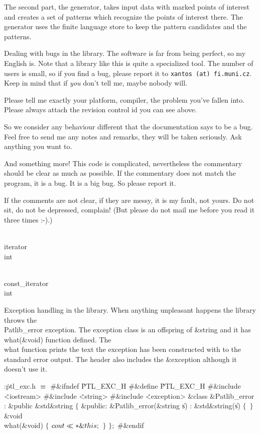 The second part, the generator, takes input data with marked points of
interest and creates a set of patterns which recognize the points of
interest there. The generator uses the finite language store to keep the
pattern candidates and the patterns.

\fi

Dealing with bugs in the library. The software is far from being perfect,
so my English is. Note that a library like this is quite a
specialized tool. The number of users is small, so if you find a bug,
please report it to {\tt xantos (at) fi.muni.cz}. Keep in mind that if
{\it you\/} don't tell me, maybe nobody will.

Please tell me exactly your platform, compiler, the problem you've fallen
into. Please always attach the revision control id you can see above.

So we consider any behaviour different that the documentation says to be a
bug. Feel free to send me any notes and remarks, they will be taken
seriously. Ask anything you want to.

And something more! This code is complicated, nevertheless the commentary
should be clear as much as possible. If the commentary does not match
the program, it is a bug. It is a big bug. So please report it.

If the comments are not clear, if they are messy, it is my fault, not
yours. Do not sit, do not be depressed, complain! (But please do not
mail me before you read it three times :-).)

\Y\B\F\\{iterator} \5
\\{int}\par
\B\F\\{const\_iterator} \5
\\{int}\par
\fi

Exception handling in the library.
When anything unpleasant happens the library throws the \\{Patlib\_error}
exception. The exception class is an offspring of \&{string} and it has
\\{what}(\&{void}) function defined. The \\{what} function prints the text the
exception has been constructed with to the standard error output.
The header also includes the \&{exception} although it doesn't use it.

\Y\B\4:\.{ptl\_exc.h }\X${}\equiv{}$\6
\8\#\&{ifndef} \.{PTL\_EXC\_H}\6
\8\#\&{define} \.{PTL\_EXC\_H}\6
\8\#\&{include} \.{<iostream>}\6
\8\#\&{include} \.{<string>}\6
\8\#\&{include} \.{<exception>}\6
\&{class} \&{Patlib\_error} : \&{public} \&{std}\DC\&{string} ${}\{{}$\1\6
\4\&{public}:\5
\&{Patlib\_error}(\&{string} \|s)\1\1\2\2\6
: \&{std}\DC\&{string}(\|s) ${}\{{}$\6
\,${}\}{}$\7
\&{void} \\{what}(\&{void})\1\1\2\2\6
${}\{{}$\1\6
${}\\{cout}\ll{*}\&{this};{}$\6
\4${}\}{}$\2\2\6
${}\};{}$\6
\8\#\&{endif}\par
\fi


